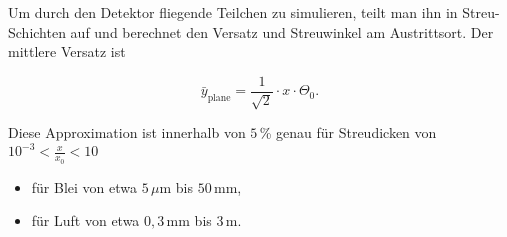 Um durch den Detektor fliegende Teilchen zu simulieren, teilt man ihn in Streu-Schichten auf und
berechnet den Versatz und Streuwinkel am Austrittsort. Der mittlere Versatz ist

\[ \bar{y}_\text{plane} = \frac{1}{\sqrt{2}}\cdot x \cdot \Theta_0. \]

Diese Approximation ist innerhalb von $5\,$\% genau für Streudicken von $10^{-3}<\frac{x}{x_0}<10$
\begin{itemize}
  \item für Blei von etwa $5\,\mu$m bis $50\,$mm,
  \item für Luft von etwa $0{,}3\,$mm bis $3\,$m.
\end{itemize}


